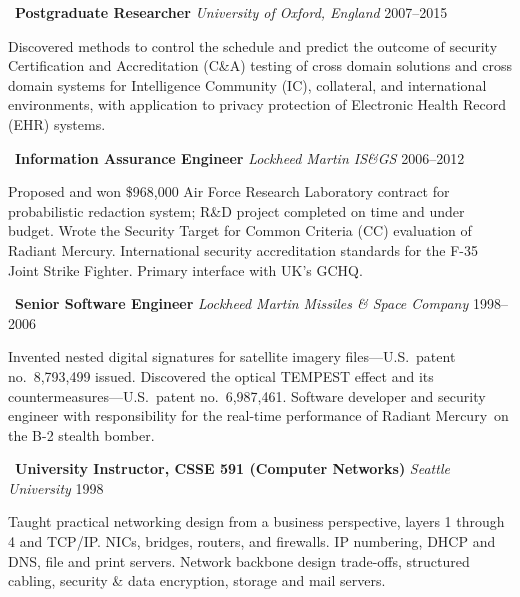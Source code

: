 \vspace{1.5mm}
\noindent\textbullet\ \textbf{Postgraduate Researcher}
    \hfill \emph{University of Oxford, England} \hfill 2007--2015

    \vspace{1mm}
    \noindent Discovered methods to control the schedule and predict the
    outcome of security Certification and Accreditation (C\&A)
    testing of cross domain solutions and cross domain systems for
    Intelligence Community (IC), collateral, and international
    environments, with application to privacy protection
    of Electronic Health Record (EHR) systems.

\vspace{1.5mm}
\noindent\textbullet\ \textbf{Information Assurance Engineer}
    \hfill \emph{Lockheed Martin IS\&GS} \hfill 2006--2012

    \vspace{1mm}
    \noindent Proposed and won \$968,000 Air Force Research Laboratory
    contract for probabilistic redaction system; R\&D
    project completed on time and under budget. Wrote the
    Security Target for Common Criteria (CC) evaluation of Radiant
    Mercury\rmtrademark. International security
    accreditation standards for the F-35 Joint Strike Fighter.
    Primary interface with UK's GCHQ.

\vspace{1.5mm}
\noindent\textbullet\ \textbf{Senior Software Engineer}
    \hfill \emph{Lockheed Martin Missiles \& Space Company} \hfill 1998--2006

    \vspace{1mm}
    \noindent Invented nested digital signatures for satellite imagery
    files---U.S.\ patent no.~8,793,499 issued. Discovered the
    optical TEMPEST effect and its countermeasures---U.S.\ patent
    no.~6,987,461. Software developer and security engineer with
    responsibility for the real-time performance of Radiant
    Mercury\rmtrademark\ on the B-2 stealth bomber.

\vspace{1.5mm}
\noindent\textbullet\ \textbf{University Instructor, CSSE 591 (Computer Networks)}
    \hfill \emph{Seattle University} \hfill 1998

    \vspace{1mm}
    \noindent Taught practical networking design from a business perspective, layers
    1 through 4 and TCP/IP. NICs, bridges, routers, and firewalls.
    IP numbering, DHCP and DNS, file and print servers. Network
    backbone design trade-offs, structured cabling, security \& data
    encryption, storage and mail servers.

